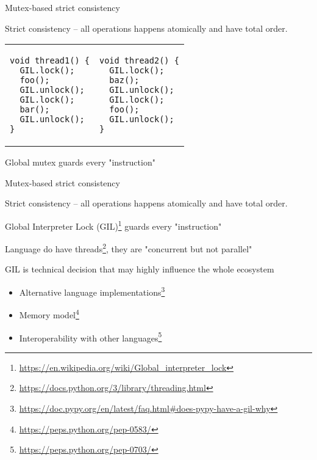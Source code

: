\begin{frame}{Mutex-based strict consistency}

Strict consistency -- all operations happens atomically and have total order.

\begin{tabular}{p{} p{}}

\begin{verbatim}
void thread1() {
  GIL.lock();
  foo();
  GIL.unlock();
  GIL.lock();
  bar();
  GIL.unlock();
}
\end{verbatim}

&

\begin{verbatim}
void thread2() {
  GIL.lock();
  baz();
  GIL.unlock();
  GIL.lock();
  foo();
  GIL.unlock();
}
\end{verbatim}

\end{tabular}

Global mutex guards every "instruction"


\end{frame}

\begin{frame}{Mutex-based strict consistency}

Strict consistency -- all operations happens atomically and have total order.

Global Interpreter Lock (GIL)\footnote{\tiny\url{https://en.wikipedia.org/wiki/Global_interpreter_lock}} guards every "instruction"
 
\pause

Language do have threads\footnote<2->{\tiny\url{https://docs.python.org/3/library/threading.html}}, they are "concurrent but not parallel"

\pause

GIL is technical decision that may highly influence the whole ecosystem
\begin{itemize}
  \item Alternative language implementations\footnote<3->{\tiny\url{https://doc.pypy.org/en/latest/faq.html#does-pypy-have-a-gil-why}}
  \item Memory model\footnote<3->{\tiny\url{https://peps.python.org/pep-0583/}}
  \item Interoperability with other languages\footnote<3->{\tiny\url{https://peps.python.org/pep-0703/}}
\end{itemize}

\end{frame}


